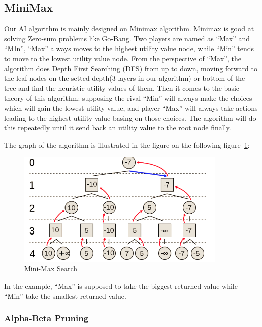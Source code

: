 \documentclass[11pt, a4paper]{article}
\begin{document}
\subsection{MiniMax}

Our AI algorithm is mainly designed on Minimax algorithm. Minimax is good at solving Zero-sum problems like Go-Bang. Two players are named as “Max” and “MIn”, “Max” always moves to the highest utility value node, while “Min” tends to move to the lowest utility value node. From the perspective of “Max”, the algorithm does Depth First Searching (DFS) from up to down, moving forward to the leaf nodes on the setted depth(3 layers in our algorithm) or bottom of the tree and find the heuristic utility values of them. Then it comes to the basic theory of this algorithm: supposing the rival “Min” will always make the choices which will gain the lowest utility value, and player “Max” will always take actions leading to the highest utility value basing on those choices. The algorithm will do this repeatedly until it send back an utility value to the root node finally.

The graph of the algorithm is illustrated in the figure on the following figure~\ref{Fig:mini-max}:

\begin{figure}[htbp]
	
	\centering %
	\includegraphics[width=10cm]{mini_max}
	
	\caption{Mini-Max Search}
	\label{Fig:mini-max}
	
\end{figure}

In the example, “Max” is supposed to take the biggest returned value while “Min” take the smallest returned value.

\subsubsection{Alpha-Beta Pruning}
\end{document}
